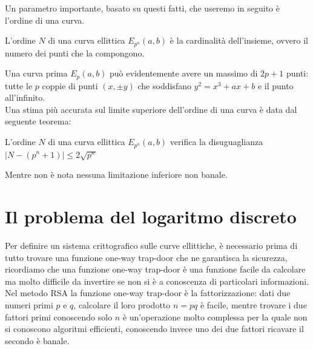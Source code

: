 \documentclass{article}
\begin{document}
	Un parametro importante, basato su questi fatti, che useremo in seguito è l'ordine di una curva.
	
	\begin{defn} 
		L'ordine $N$ di una curva ellittica $E_{p^{n}}(a,b)$ è la cardinalità dell'insieme, ovvero il numero dei punti che la compongono.
	\end{defn}
	
	Una curva prima $E_{p}(a,b)$ può evidentemente avere un massimo di $2p+1$ punti: 
	tutte le $p$ coppie di punti $(x, \pm y)$ che soddisfano $y^{2} = x^{3} + ax + b$ e il punto all'infinito.\\
	
	Una stima più accurata sul limite superiore dell'ordine di una curva è data dal seguente teorema:
	
	\begin{teo}[Hasse] 
		L'ordine $N$ di una curva ellittica $E_{p^{n}}(a,b)$ verifica la disuguaglianza $| N - (p^{n} +1) | \leq 2\sqrt{p^{n}}$
	\end{teo}
	
	Mentre non è nota nessuna limitazione inferiore non banale.
	
	\clearpage
	
	\section{Il problema del logaritmo discreto}
	
	Per definire un sistema crittografico sulle curve ellittiche, è necessario prima di tutto trovare 
	una funzione one-way trap-door che ne garantisca la sicurezza, ricordiamo che una funzione one-way
	trap-door è una funzione facile da calcolare ma molto difficile da invertire 
	se non si è a conoscenza di particolari informazioni.\\
	
	Nel metodo RSA la funzione one-way trap-door è la fattorizzazione: dati due numeri primi $p$ e $q$, calcolare 
	il loro prodotto $n = pq$ è facile, mentre trovare i due fattori primi conoscendo solo $n$ 
	è un'operazione molto complessa per la quale non si conoscono algoritmi efficienti, 
	conoscendo invece uno dei due fattori ricavare il secondo è banale.\\
	
\end{document}
